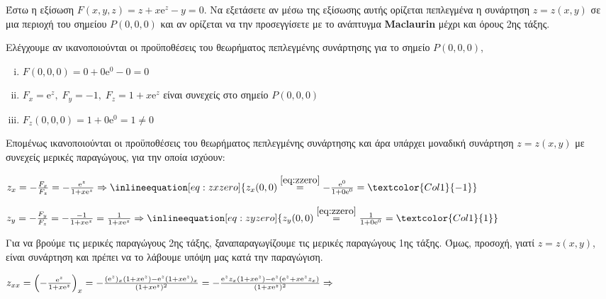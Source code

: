 \documentclass[a4paper,table]{report}
\begin{document}
\begin{mybox3}
  \begin{thema}
    Έστω η εξίσωση $ F(x,y,z)=z+x \mathrm{e}^{z} - y = 0 $. Να εξετάσετε αν μέσω της
    εξίσωσης αυτής ορίζεται 
    πεπλεγμένα η συνάρτηση $ z=z(x,y) $ σε μια περιοχή του σημείου $ P(0,0,0) $ και αν 
    ορίζεται να την προσεγγίσετε με το ανάπτυγμα \textbf{Maclaurin} μέχρι και όρους 2ης 
    τάξης.
  \end{thema}
\end{mybox3}
\begin{solution}
  \item {}
    Ελέγχουμε αν ικανοποιούνται οι προϋποθέσεις του θεωρήματος πεπλεγμένης 
    συνάρτησης για το σημείο $ P(0,0,0) $, 
    \begin{enumerate}[i)]
      \item $ F(0,0,0) = 0+0 \mathrm{e}^{0}-0 = 0 $
      \item $ F_{x} = \mathrm{e}^{z}, \; F_{y} = -1, \; F_{z} = 1+ x \mathrm{e}^{z}
        $ είναι συνεχείς στο σημείο $ P(0,0,0) $ 
      \item $ F_{z}(0,0,0) = 1 + 0 \mathrm{e}^{0} = 1 \neq 0 $
    \end{enumerate}
    Επομένως ικανοποιούνται οι προϋποθέσεις του θεωρήματος πεπλεγμένης συνάρτησης και 
    άρα υπάρχει μοναδική συνάρτηση $ z=z(x,y) $ με συνεχείς μερικές παραγώγους, για την 
    οποία ισχύουν:
    \begin{myitemize}
      \item {} 
      \item $ z_{x} = - \frac{F_{x}}{F_{z}} = - \frac{\mathrm{e}^{z}}{1+x 
        \mathrm{e}^{z} } \Rightarrow \inlineequation[eq:zxzero]
        {z_{x}(0,0) \overset{\eqref{eq:zzero}}{=} - 
        \frac{\mathrm{e}^{0}}{1+ 0 \mathrm{e}^{0}} = \textcolor{Col1}{-1}} $
      \item $ z_{y} = - \frac{F_{y}}{F_{z}} = - \frac{-1}{1+x \mathrm{e}^{z}} =
        \frac{1}{1+x \mathrm{e}^{z}} \Rightarrow 
        \inlineequation[eq:zyzero]{z_{y}(0,0) \overset{\eqref{eq:zzero}}{=} 
        \frac{1}{1+0 \mathrm{e}^{0}} = \textcolor{Col1}{1}} $ 
    \end{myitemize}
    Για να βρούμε τις μερικές παραγώγους 2ης τάξης, ξαναπαραγωγίζουμε τις μερικές
    παραγώγους 1ης τάξης. Όμως, \textcolor{Col1}{προσοχή}, γιατί $ z=z(x,y) $, 
    είναι συνάρτηση και πρέπει να το λάβουμε υπόψη μας κατά την παραγώγιση.
    \begin{myitemize}
      \item $ z_{xx} = \Bigl(- \frac{\mathrm{e}^{z}}{1+ x \mathrm{e}^{z}}\Bigr)_{x} = - 
        \frac{(\mathrm{e}^{z})_{x} (1+x \mathrm{e}^{z}) - \mathrm{e}^{z}(1+x 
        \mathrm{e}^{z})_{x}}{(1+x \mathrm{e}^{z} )^{2}} = - 
        \frac{\mathrm{e}^{z}z_{x}(1+x \mathrm{e}^{z}) - 
        \mathrm{e}^{z}(\mathrm{e}^{z} + x \mathrm{e}^{z} z_{x})}{(1+x
      \mathrm{e}^{z})^{2}} \Rightarrow $


\end{myitemize}
\end{solution}
\end{document}
